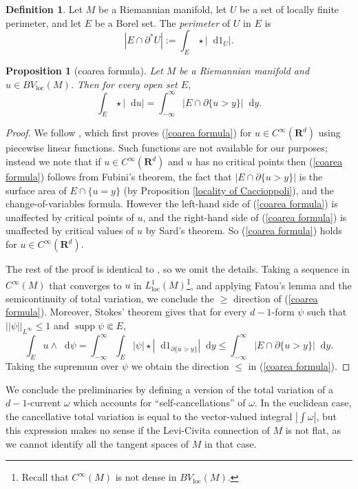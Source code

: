 \documentclass[reqno,12pt,letterpaper]{amsart}
\newcommand{\RR}{\mathbf{R}}
\DeclareMathOperator{\supp}{supp}
\newcommand*\dif{\mathop{}\!\mathrm{d}}
\newcommand{\dfn}[1]{\emph{#1}\index{#1}}
\newcommand{\loc}{\mathrm{loc}}
\newtheorem{proposition}[theorem]{Proposition}
\theoremstyle{definition}
\newtheorem{definition}[theorem]{Definition}
\numberwithin{equation}{section}
\begin{document}
\begin{definition}
Let $M$ be a Riemannian manifold, let $U$ be a set of locally finite perimeter, and let $E$ be a Borel set.
The \dfn{perimeter} of $U$ in $E$ is
$$|E \cap \partial^* U| := \int_E \star |\dif 1_U|.$$
\end{definition}

\begin{proposition}[coarea formula]\label{Coarea2}
Let $M$ be a Riemannian manifold and $u \in BV_\loc(M)$. Then for every open set $E$,
\begin{equation}\label{coarea formula}
\int_E \star |\dif u| = \int_{-\infty}^\infty |E \cap \partial \{u > y\}| \dif y.
\end{equation}
\end{proposition}
\begin{proof}
We follow \cite[Theorem 1.23]{Giusti77}, which first proves (\ref{coarea formula}) for $u \in C^\infty(\RR^d)$ using piecewise linear functions.
Such functions are not available for our purposes; instead we note that if $u \in C^\infty(\RR^d)$ and $u$ has no critical points then (\ref{coarea formula}) follows from Fubini's theorem, the fact that $|E \cap \partial \{u > y\}|$ is the surface area of $E \cap \{u = y\}$ (by Proposition \ref{locality of Caccioppoli}), and the change-of-variables formula.
However the left-hand side of (\ref{coarea formula}) is unaffected by critical points of $u$, and the right-hand side of (\ref{coarea formula}) is unaffected by critical values of $u$ by Sard's theorem.
So (\ref{coarea formula}) holds for $u \in C^\infty(\RR^d)$.

The rest of the proof is identical to \cite[Theorem 1.23]{Giusti77}, so we omit the details.
Taking a sequence in $C^\infty(M)$ that converges to $u$ in $L^1_\loc(M)$\footnote{Recall that $C^\infty(M)$ is not dense in $BV_\loc(M)$.}, and applying Fatou's lemma and the semicontinuity of total variation, we conclude the $\geq$ direction of (\ref{coarea formula}).
Moreover, Stokes' theorem gives that for every $d-1$-form $\psi$ such that $||\psi||_{L^\infty} \leq 1$ and $\supp \psi \Subset E$,
$$\int_E u \wedge \dif \psi = \int_{-\infty}^\infty \int_E |\psi| \star |\dif 1_{\partial \{u > y\}}| \dif y \leq \int_{-\infty}^\infty |E \cap \partial \{u > y\}| \dif y.$$
Taking the supremum over $\psi$ we obtain the direction $\leq$ in (\ref{coarea formula}).
\end{proof}

We conclude the preliminaries by defining a version of the total variation of a $d-1$-current $\omega$ which accounts for ``self-cancellations'' of $\omega$.
In the euclidean case, the cancellative total variation is equal to the vector-valued integral $|\int \omega|$, but this expression makes no sense if the Levi-Civita connection of $M$ is not flat, as we cannot identify all the tangent spaces of $M$ in that case.
\end{document}
